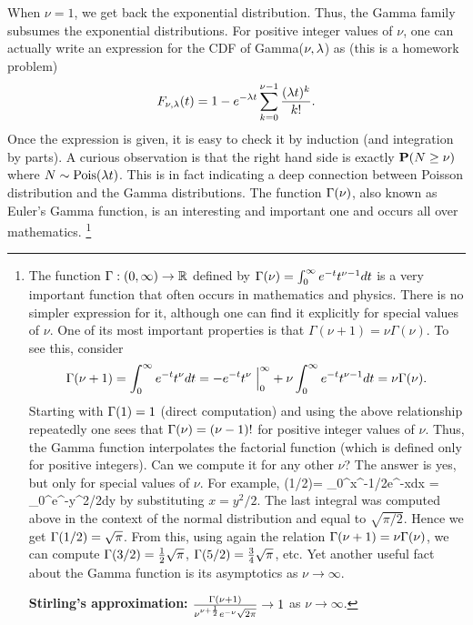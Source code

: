 \documentclass[preprint,  11pt]{amsart}
\begin{document}
When $\nu=1$, we get back the exponential distribution. Thus, the Gamma family subsumes the exponential distributions.   For positive integer values of $\nu$, one can actually write an expression for the CDF of Gamma($\nu,\lam$)  as (this is a homework problem)
$$
F_{\nu,\lam}(t)=1-e^{-\lam t}\summ_{k=0}^{\nu-1}\frac{(\lam t)^{k}}{k!}.
$$
Once the expression is given, it is easy to check it by induction (and integration by parts). A curious observation is that the right hand side is exactly $\P(N\ge \nu)$ where $N\sim \mb{Pois}(\lam t)$. This is in fact indicating a deep connection between Poisson distribution and the Gamma distributions. The function $\Gam(\nu)$, also known as Euler's Gamma function, is an interesting and important  one and occurs all over mathematics.
\footnote{ The function $\Gam:(0,\infty)\to \R$ defined by $\Gam(\nu)=\int_{0}^{\infty}e^{-t}t^{\nu-1}dt$ is a very important function that often occurs in mathematics and physics. There is no simpler expression for it, although one can find it explicitly for special values of $\nu$. One of its most important properties is that $\Gamma(\nu+1)=\nu\Gamma(\nu)$. To see this, consider
$$
\Gam(\nu+1)=\int_{0}^{\infty}e^{-t}t^{\nu}dt = -e^{-t}t^{\nu}\given_{0}^{\infty}+\nu\int_{0}^{\infty}e^{-t}t^{\nu-1}dt = \nu \Gam(\nu).
$$
Starting with  $\Gam(1)=1$ (direct computation) and using the above relationship repeatedly one sees that $\Gam(\nu)=(\nu-1)!$ for positive integer values of $\nu$. Thus, the Gamma function interpolates the factorial function (which is defined only for positive integers).  Can we compute it for any other $\nu$? The answer is yes, but only for special values of $\nu$. For example,
\ba
\Gam(1/2)= \int_{0}^{\infty}x^{-1/2}e^{-x}dx = \int_{0}^{\infty}e^{-y^{2}/2}dy
\ea
by substituting $x=y^{2}/2$. The last integral was computed above in the context of the normal distribution and equal to $\sqrt{\pi/2}$. Hence we get $\Gam(1/2)=\sqrt{\pi}$. From this, using again the relation $\Gam(\nu+1)=\nu\Gam(\nu)$, we can compute $\Gam(3/2)=\frac{1}{2}\sqrt{\pi}$, $\Gam(5/2)=\frac{3}{4}\sqrt{\pi}$, etc. Yet another useful fact about the Gamma function is its asymptotics as $\nu\to\infty$.

{\bf Stirling's approximation:} $\frac{\Gam(\nu+1)}{\nu^{\nu+\frac{1}{2}}e^{-\nu}\sqrt{2\pi}}\to 1$ as $\nu\to \infty$.

}
\end{document}
